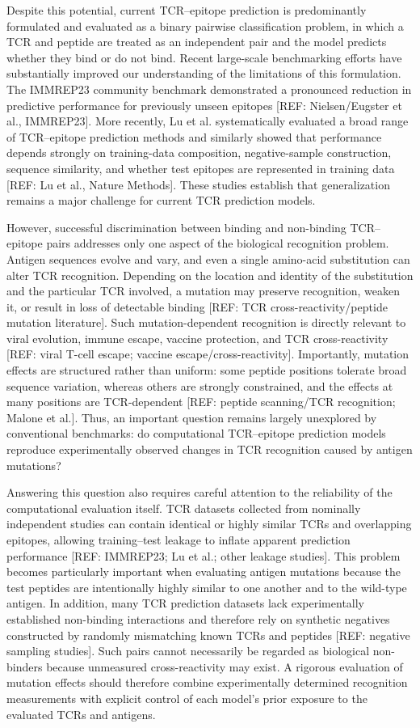 Despite this potential, current TCR–epitope prediction is predominantly formulated and evaluated as a binary pairwise classification problem, in which a TCR and peptide are treated as an independent pair and the model predicts whether they bind or do not bind. Recent large-scale benchmarking efforts have substantially improved our understanding of the limitations of this formulation. The IMMREP23 community benchmark demonstrated a pronounced reduction in predictive performance for previously unseen epitopes [REF: Nielsen/Eugster et al., IMMREP23]. More recently, Lu et al. systematically evaluated a broad range of TCR–epitope prediction methods and similarly showed that performance depends strongly on training-data composition, negative-sample construction, sequence similarity, and whether test epitopes are represented in training data [REF: Lu et al., Nature Methods]. These studies establish that generalization remains a major challenge for current TCR prediction models.

However, successful discrimination between binding and non-binding TCR–epitope pairs addresses only one aspect of the biological recognition problem. Antigen sequences evolve and vary, and even a single amino-acid substitution can alter TCR recognition. Depending on the location and identity of the substitution and the particular TCR involved, a mutation may preserve recognition, weaken it, or result in loss of detectable binding [REF: TCR cross-reactivity/peptide mutation literature]. Such mutation-dependent recognition is directly relevant to viral evolution, immune escape, vaccine protection, and TCR cross-reactivity [REF: viral T-cell escape; vaccine escape/cross-reactivity]. Importantly, mutation effects are structured rather than uniform: some peptide positions tolerate broad sequence variation, whereas others are strongly constrained, and the effects at many positions are TCR-dependent [REF: peptide scanning/TCR recognition; Malone et al.]. Thus, an important question remains largely unexplored by conventional benchmarks: do computational TCR–epitope prediction models reproduce experimentally observed changes in TCR recognition caused by antigen mutations?

Answering this question also requires careful attention to the reliability of the computational evaluation itself. TCR datasets collected from nominally independent studies can contain identical or highly similar TCRs and overlapping epitopes, allowing training–test leakage to inflate apparent prediction performance [REF: IMMREP23; Lu et al.; other leakage studies]. This problem becomes particularly important when evaluating antigen mutations because the test peptides are intentionally highly similar to one another and to the wild-type antigen. In addition, many TCR prediction datasets lack experimentally established non-binding interactions and therefore rely on synthetic negatives constructed by randomly mismatching known TCRs and peptides [REF: negative sampling studies]. Such pairs cannot necessarily be regarded as biological non-binders because unmeasured cross-reactivity may exist. A rigorous evaluation of mutation effects should therefore combine experimentally determined recognition measurements with explicit control of each model's prior exposure to the evaluated TCRs and antigens.

